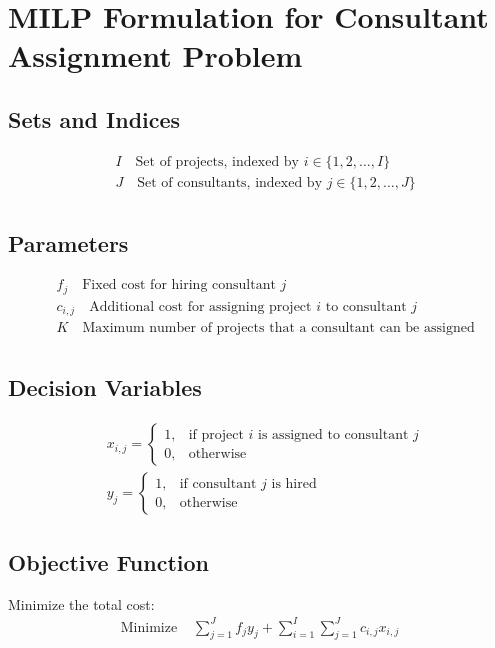 \documentclass{article}
\begin{document}
\section*{MILP Formulation for Consultant Assignment Problem}

\subsection*{Sets and Indices}
\begin{align*}
&I \quad \text{Set of projects, indexed by } i \in \{1, 2, \ldots, I\} \\
&J \quad \text{Set of consultants, indexed by } j \in \{1, 2, \ldots, J\} \\
\end{align*}

\subsection*{Parameters}
\begin{align*}
&f_j \quad \text{Fixed cost for hiring consultant } j \\
&c_{i,j} \quad \text{Additional cost for assigning project } i \text{ to consultant } j \\
&K \quad \text{Maximum number of projects that a consultant can be assigned} \\
\end{align*}

\subsection*{Decision Variables}
\begin{align*}
&x_{i,j} = 
\begin{cases} 
1, & \text{if project } i \text{ is assigned to consultant } j \\
0, & \text{otherwise} 
\end{cases} \\
&y_j = 
\begin{cases} 
1, & \text{if consultant } j \text{ is hired} \\
0, & \text{otherwise} 
\end{cases}
\end{align*}

\subsection*{Objective Function}
Minimize the total cost:
\begin{align*}
\text{Minimize } & \sum_{j=1}^{J} f_j y_j + \sum_{i=1}^{I} \sum_{j=1}^{J} c_{i,j} x_{i,j}
\end{align*}
\end{document}
